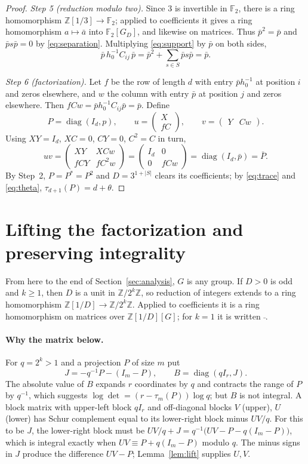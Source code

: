 \documentclass[11pt]{article}
\theoremstyle{remark}
\numberwithin{equation}{section}
\newcommand{\F}{\mathbb F}
\newcommand{\Z}{\mathbb Z}
\newcommand{\diag}{\operatorname{diag}}
\begin{document}
\begin{proof}
\emph{Step 5 (reduction modulo two).} Since $3$ is invertible in $\F_2$, there is a ring homomorphism $\Z[1/3]\to\F_2$; applied to coefficients it gives a ring homomorphism $a\mapsto\bar a$ into $\F_2[G_D]$, and likewise on matrices. Thus $\bar p^2=\bar p$ and $\bar ps\bar p=0$ by \eqref{eq:separation}. Multiplying \eqref{eq:support} by $\bar p$ on both sides,
\[
 \bar p\,h_0^{-1}C_{ij}\,\bar p=\bar p^2+\sum_{s\in S}\bar ps\bar p=\bar p.
\]

\emph{Step 6 (factorization).} Let $f$ be the row of length $d$ with entry $\bar ph_0^{-1}$ at position $i$ and zeros elsewhere, and $w$ the column with entry $\bar p$ at position $j$ and zeros elsewhere. Then $fCw=\bar ph_0^{-1}C_{ij}\bar p=\bar p$. Define
\[
 P=\diag(I_d,p),\qquad
 u=\begin{pmatrix}X\\fC\end{pmatrix},\qquad
 v=\begin{pmatrix}Y&Cw\end{pmatrix}.
\]
Using $XY=I_d$, $XC=0$, $CY=0$, $C^2=C$ in turn,
\[
 uv=\begin{pmatrix}XY&XCw\\fCY&fC^2w\end{pmatrix}
 =\begin{pmatrix}I_d&0\\0&fCw\end{pmatrix}=\diag(I_d,\bar p)=\bar P.
\]
By Step~2, $P=P^*=P^2$ and $D=3^{1+|S|}$ clears its coefficients; by \eqref{eq:trace} and \eqref{eq:theta}, $\tau_{d+1}(P)=d+\theta$.
\end{proof}

\section{Lifting the factorization and preserving integrality}
\label{sec:lifting}

From here to the end of Section~\ref{sec:analysis}, $G$ is any group. If $D>0$ is odd and $k\ge1$, then $D$ is a unit in $\Z/2^k\Z$, so reduction of integers extends to a ring homomorphism $\Z[1/D]\to\Z/2^k\Z$. Applied to coefficients it is a ring homomorphism on matrices over $\Z[1/D][G]$; for $k=1$ it is written $\bar{\ }$.

\paragraph{Why the matrix below.}
For $q=2^k>1$ and a projection $P$ of size $m$ put
\[
 J=-q^{-1}P-(I_m-P),\qquad B=\diag(qI_r,J).
\]
The absolute value of $B$ expands $r$ coordinates by $q$ and contracts the range of $P$ by $q^{-1}$, which suggests $\log\det=(r-\tau_m(P))\log q$; but $B$ is not integral. A block matrix with upper-left block $qI_r$ and off-diagonal blocks $V$ (upper), $U$ (lower) has Schur complement equal to its lower-right block minus $UV/q$. For this to be $J$, the lower-right block must be $UV/q+J=q^{-1}\bigl(UV-P-q(I_m-P)\bigr)$, which is integral exactly when $UV\equiv P+q(I_m-P)$ modulo $q$. The minus signs in $J$ produce the difference $UV-P$; Lemma~\ref{lem:lift} supplies $U,V$.
\end{document}
